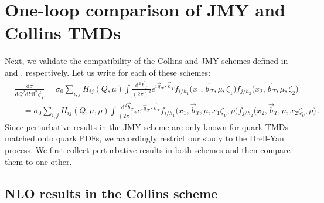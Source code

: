 \documentclass[11pt,a4paper]{article}
\newcommand{\df}{\mathrm{d}}
\newcommand{\img}{\mathrm{i}}
\newcommand{\nn}{\nonumber}
\newcommand{\bt}{\vec b_T}
\newcommand{\qt}{\vec q_T}
\newcommand{\tv}{{\tilde v}}
\begin{document}
\section{One-loop comparison of JMY and Collins TMDs}
\label{app:JMY_vs_Collins}

Next, we validate the compatibility of the Collins and JMY schemes
defined in  and , respectively. 
Let us write  for each of these schemes:
\begin{align} \label{eq:app:fact_thm_cmp}
 & \frac{\df\sigma}{\df Q^2 \df Y \df^2\qt} 
 = \sigma_0 \sum_{i,j} H_{ij}(Q, \mu)
   \!\!\int\!\frac{\df^2\bt}{(2\pi)^2} e^{\img \qt \cdot \bt}
   f_{i/h_1}\bigl(x_1, \bt, \mu, \zeta_1\bigr) 
   f_{j/h_2}\bigl(x_2, \bt, \mu, \zeta_2 \bigr) \
\\\nn&\quad
 = \sigma_0 \sum_{i,j} H_{ij}(Q, \mu, \rho)
   \int\frac{\df^2\bt}{(2\pi)^2} e^{\img \qt \cdot \bt}
   f_{i/h_1}\bigl(x_1, \bt, \mu, x_1 \zeta_v, \rho\bigr)
   f_{j/h_2}\bigl(x_2, \bt, \mu, x_2 \zeta_\tv, \rho\bigr)
\,.\end{align}
Since perturbative results in the JMY scheme are only known for quark TMDs matched onto quark PDFs,
we accordingly restrict our study to the Drell-Yan process. We first collect perturbative results
in both schemes and then compare them to one other.

\subsection{NLO results in the Collins scheme}
\label{sec:nlo-collins}
\end{document}
